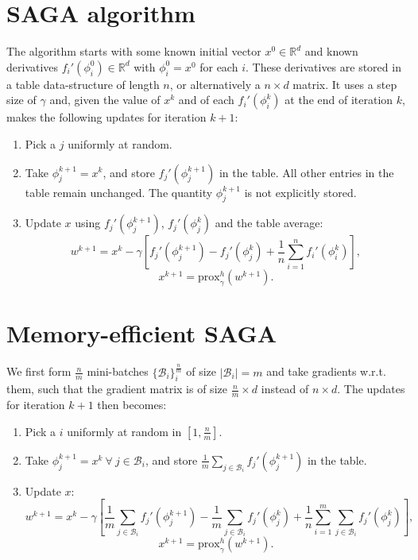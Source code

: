 \documentclass[a4paper,11pt]{article}
\newcommand{\R}{\mathbb{R}}
\newcommand{\B}{\mathcal{B}}
\newcommand{\prox}{\textrm{prox}}
\begin{document}
\section{SAGA algorithm}

The algorithm starts with some known initial vector $x^0 \in \R^d$ and known
derivatives $f_i' (\phi_i^0) \in \R^d$ with $\phi_i^0 = x^0$ for each $i$. These
derivatives are stored in a table data-structure of length $n$, or alternatively
a $n \times d$ matrix. It uses a step size of $\gamma$ and, given the value of
$x^k$ and of each $f_i' (\phi_i^k)$ at the end of iteration $k$, makes the
following updates for iteration $k+1$:
\begin{enumerate}
\item Pick a $j$ uniformly at random.
\item Take $\phi_j^{k+1} = x^k$, and store $f_j'(\phi_j^{k+1})$ in the table.
	All other entries in the table remain unchanged. The quantity $\phi_j^{k+1}$
	is not explicitly stored.
\item Update $x$ using $f_j'(\phi_j^{k+1})$, $f_j'(\phi_j^k)$ and the table
	average:
	\begin{equation} \label{eqn:saga}
	w^{k+1} = x^k - \gamma \left[ f_j'(\phi_j^{k+1}) - f_j'(\phi_j^k)
	+ \frac1n \sum_{i=1}^n f_i'(\phi_i^k) \right] ,
	\end{equation}
	$$x^{k+1} = \prox_\gamma^h (w^{k+1}).$$
\end{enumerate}

\section{Memory-efficient SAGA}

We first form $\frac{n}m$ mini-batches $\{\B_i\}_i^{\frac{n}m}$ of size $|\B_i|
= m$ and take gradients w.r.t. them, such that the gradient matrix is of size
$\frac{n}m \times d$ instead of $n \times d$. The updates for iteration $k+1$
then becomes:
\begin{enumerate}
\item Pick a $i$ uniformly at random in $[1, \frac{n}m]$.
\item Take $\phi_j^{k+1} = x^k \ \forall \ j \in \B_i$, and store $\frac1m
	\sum_{j\in\B_i} f_j'(\phi_j^{k+1})$ in the table.
\item Update $x$:
	\begin{equation} \label{eqn:saga}
	w^{k+1} = x^k - \gamma \left[ \frac1m \sum_{j\in\B_i} f_j'(\phi_j^{k+1})
	- \frac1m \sum_{j\in\B_i} f_j'(\phi_j^k)
	+ \frac1n \sum_{i=1}^m \sum_{j\in\B_i} f_j'(\phi_j^k) \right] ,
	\end{equation}
	$$x^{k+1} = \prox_\gamma^h (w^{k+1}).$$
\end{enumerate}
\end{document}
